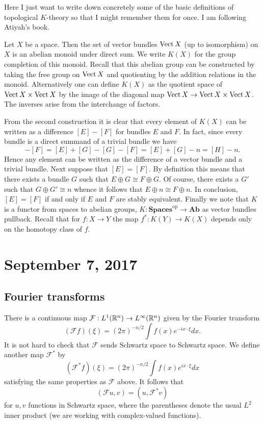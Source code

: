 \documentclass{amsart}
\begin{document}
Here I just want to write down concretely some of the basic definitions of topological
$K$-theory so that I might remember them for once. I am following Atiyah's book.

Let $X$ be a space. Then the set of vector bundles $\operatorname{Vect} X$ (up to isomorphism)
on $X$ is an abelian monoid
under direct sum. We write $K(X)$ for the group completion of this monoid. Recall that
this abelian group can be constructed by taking the free group on $\operatorname{Vect} X$ and
quotienting by the addition relations in the monoid. Alternatively one can define
$K(X)$ as the quotient space of $\operatorname{Vect} X\times \operatorname{Vect} X$ by the image of the diagonal
map $\operatorname{Vect} X\to \operatorname{Vect} X\times \operatorname{Vect} X$. The inverses arise from the interchange
of factors.

From the second construction it is clear that every element of $K(X)$ can be
written as a difference $[E]-[F]$ for bundles $E$ and $F$. In fact, since
every bundle is a direct summand of a trivial bundle we have
\begin{equation*}
    [E]-[F] = [E] + [G] - [G] - [F] = [E] + [G] - n = [H] - n.
\end{equation*}
Hence any element can be written as the difference of a vector bundle and a
trivial bundle. Next suppose that $[E]=[F]$. By definition this means that
there exists a bundle $G$ such that $E\oplus G\cong F\oplus G$. Of course,
there exists a $G'$ such that $G\oplus G'\cong n$ whence it follows that
$E\oplus n\cong F\oplus n$. In conclusion, $[E]=[F]$ if and only if $E$
and $F$ are stably equivalent. Finally we note that $K$ is a functor from
spaces to abelian groups, $K:\mathbf{Spaces}^\text{op} \to \mathbf{Ab}$
as vector bundles pullback. Recall that for $f:X\to Y$ the map $f^*:K(Y)\to K(X)$
depends only on the homotopy class of $f$.


\section{September 7, 2017}

\subsection{Fourier transforms}
There is a continuous map $\mathcal{F}:L^1(\mathbb{R}^n)\to L^\infty(\mathbb{R}^n)$ given by the Fourier
transform
\begin{equation*}
    (\mathcal{F}f)(\xi) = (2\pi)^{-n/2} \int f(x) e^{-ix\cdot\xi} dx.
\end{equation*}
It is not hard to check that $\mathcal{F}$ sends Schwartz space to
Schwartz space. We define another map $\mathcal{F}^*$ by
\begin{equation*}
    (\mathcal{F}^*f)(\xi) = (2\pi)^{-n/2}\int f(x) e^{ix\cdot \xi} dx
\end{equation*}
satisfying the same properties as $\mathcal{F}$ above. It follows that
\begin{equation*}
    (\mathcal{F} u, v) =(u, \mathcal{F}^* v)
\end{equation*}
for $u,v$ functions in Schwartz space, where the parentheses denote the
usual $L^2$ inner product (we are working with complex-valued functions).
\end{document}
